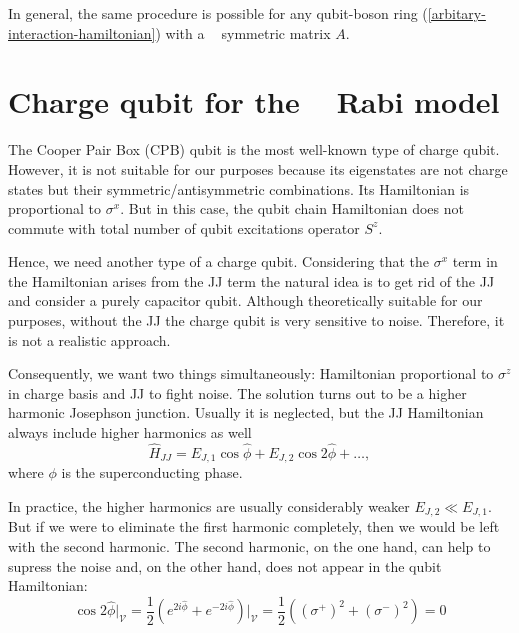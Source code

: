 \documentclass[reprint, aps, prx, amsmath, amssymb, longbibliography, superscriptaddress]{revtex4-2}
\DeclareMathOperator{\Zthree}{\mathbb{Z}_3}
\begin{document}
In general, the same procedure is possible for any qubit-boson ring (\ref{arbitary-interaction-hamiltonian}) with a $\Zthree$ symmetric matrix $A$.




\section{Charge qubit for the \texorpdfstring{$\Zthree$}{Z3} Rabi model}
\label{charge-qubit}



The Cooper Pair Box (CPB) qubit is the most well-known type of charge qubit. However, it is not suitable for our purposes because its eigenstates are not charge states but their symmetric/antisymmetric combinations. Its Hamiltonian is proportional to $\sigma^x$. But in this case, the qubit chain Hamiltonian does not commute with total number of qubit excitations operator $S^z$.

Hence, we need another type of a charge qubit. Considering that the $\sigma^x$ term in the Hamiltonian arises from the JJ term the natural idea is to get rid of the JJ and consider a purely capacitor qubit. Although theoretically suitable for our purposes, without the JJ the charge qubit is very sensitive to noise. Therefore, it is not a realistic approach.

Consequently, we want two things simultaneously: Hamiltonian proportional to $\sigma^z$ in charge basis and JJ to fight noise. The solution turns out to be a higher harmonic Josephson junction. Usually it is neglected, but the JJ Hamiltonian always include higher harmonics as well
\begin{equation}
    \hat H_{JJ} = E_{J,1} \cos{\hat \phi} + E_{J,2} \cos{2\hat \phi} + \dots,
\end{equation}
where $\phi$ is the superconducting phase.

In practice, the higher harmonics are usually considerably weaker $E_{J,2} \ll E_{J,1}$. But if we were to eliminate the first harmonic completely, then we would be left with the second harmonic. The second harmonic, on the one hand, can help to supress the noise and, on the other hand, does not appear in the qubit Hamiltonian:
\begin{equation}
    \cos{2\hat \phi}\bigg|_{\mathcal{V}} = \frac{1}{2}\left(e^{2i\hat\phi} + e^{-2i\hat \phi}\right)\bigg|_{\mathcal{V}}=\frac{1}{2}\left((\sigma^+)^2 + (\sigma^-)^2\right) =0
\end{equation}
\end{document}
